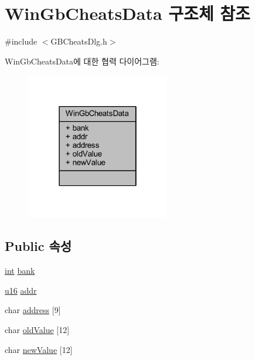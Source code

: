 \hypertarget{struct_win_gb_cheats_data}{}\section{Win\+Gb\+Cheats\+Data 구조체 참조}
\label{struct_win_gb_cheats_data}


{\ttfamily \#include $<$G\+B\+Cheats\+Dlg.\+h$>$}



Win\+Gb\+Cheats\+Data에 대한 협력 다이어그램\+:\nopagebreak
\begin{figure}[H]
\begin{center}
\leavevmode
\includegraphics[width=178pt]{struct_win_gb_cheats_data__coll__graph}
\end{center}
\end{figure}
\subsection*{Public 속성}
\begin{DoxyCompactItemize}
\item 
\mbox{\hyperlink{_util_8cpp_a0ef32aa8672df19503a49fab2d0c8071}{int}} \mbox{\hyperlink{struct_win_gb_cheats_data_a3cbfcdcf0184d58e83261e2238385480}{bank}}
\item 
\mbox{\hyperlink{_system_8h_a9e6c91d77e24643b888dbd1a1a590054}{u16}} \mbox{\hyperlink{struct_win_gb_cheats_data_a80015100674ee2f689deb0f182ba6ca8}{addr}}
\item 
char \mbox{\hyperlink{struct_win_gb_cheats_data_a7d260c5c47f95346767df3da6838221c}{address}} \mbox{[}9\mbox{]}
\item 
char \mbox{\hyperlink{struct_win_gb_cheats_data_abe8e108df6ab1b40209bdc2e3e490c8a}{old\+Value}} \mbox{[}12\mbox{]}
\item 
char \mbox{\hyperlink{struct_win_gb_cheats_data_a6fc49b4d1e4bb935624c98a337091eb9}{new\+Value}} \mbox{[}12\mbox{]}
\end{DoxyCompactItemize}


